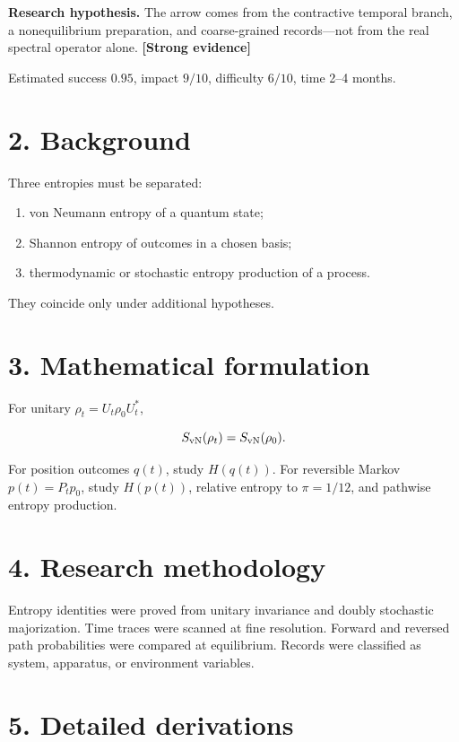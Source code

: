 \documentclass[11pt,a4paper,openany]{report}
\newcommand{\statusStrong}{\textcolor{finblue}{[Strong evidence]}}
\begin{document}
\textbf{Research hypothesis.} The arrow comes from the contractive temporal branch, a nonequilibrium preparation, and coarse-grained records—not from the real spectral operator alone. \textbf{\statusStrong{}}

Estimated success \(0.95\), impact \(9/10\), difficulty \(6/10\), time 2–4 months.

\section{2. Background}

Three entropies must be separated:

\begin{enumerate}
\item 
von Neumann entropy of a quantum state;

\item 
Shannon entropy of outcomes in a chosen basis;

\item 
thermodynamic or stochastic entropy production of a process.

\end{enumerate}

They coincide only under additional hypotheses.

\section{3. Mathematical formulation}

For unitary \(\rho_t=U_t\rho_0U_t^*\),

\[
S_{\rm vN}(\rho_t)=S_{\rm vN}(\rho_0).
\]

For position outcomes \(q(t)\), study \(H(q(t))\). For reversible Markov \(p(t)=P_tp_0\), study \(H(p(t))\), relative entropy to \(\pi=1/12\), and pathwise entropy production.

\section{4. Research methodology}

Entropy identities were proved from unitary invariance and doubly stochastic majorization. Time traces were scanned at fine resolution. Forward and reversed path probabilities were compared at equilibrium. Records were classified as system, apparatus, or environment variables.

\section{5. Detailed derivations}
\end{document}
